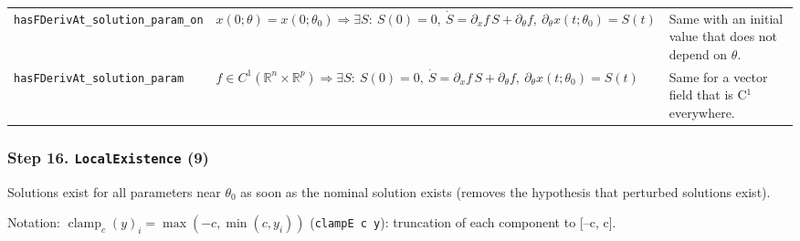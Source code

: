 {\begin{longtable}{@{}>{\raggedright\arraybackslash}p{3.6cm}>{\raggedright\arraybackslash}p{6.6cm}>{\raggedright\arraybackslash}p{5.6cm}@{}}
\texttt{hasFDerivAt\_\allowbreak{}solution\_\allowbreak{}param\_\allowbreak{}on} & $\displaystyle x(0;\theta)=x(0;\theta_0)\Rightarrow\exists S:\ S(0)=0,\ \dot S=\partial_xf\,S+\partial_\theta f,\ \partial_\theta x(t;\theta_0)=S(t)$ & Same with an initial value that does not depend on $\theta$. \\[3pt]
\texttt{hasFDerivAt\_\allowbreak{}solution\_\allowbreak{}param} & $\displaystyle f\in C^1(\mathbb{R}^n\times\mathbb{R}^p)\Rightarrow\exists S:\ S(0)=0,\ \dot S=\partial_xf\,S+\partial_\theta f,\ \partial_\theta x(t;\theta_0)=S(t)$ & Same for a vector field that is C$^1$ everywhere. \\[3pt]
\bottomrule
\end{longtable}
}

\subsubsection*{Step 16. \texttt{LocalExistence} (9)}
Solutions exist for all parameters near $\theta_0$ as soon as the nominal solution exists (removes the hypothesis that perturbed solutions exist).

{\small\raggedright Notation: $\operatorname{clamp}_c(y)_i=\max(-c,\min(c,y_i))$ (\texttt{clampE c y}): truncation of each component to [--c, c].}


